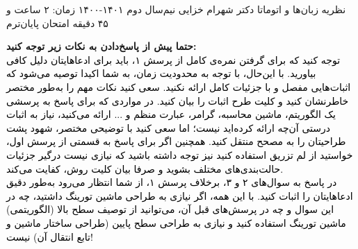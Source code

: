 \documentclass[a4paper,12pt]{article}
\begin{document}
\handout
{نظریه زبان‌ها و اتوماتا}
{دکتر شهرام خزایی}
{نیم‌سال دوم ۱۴۰۱-۱۴۰۰}
{}
{}
{زمان: ۲ ساعت و ۴۵ دقیقه}
 {امتحان پایان‌ترم}
 
\textbf{ حتما پیش از پاسخ‌دادن به نکات زیر توجه کنید:}\\
\textcolor{black}{ توجه کنید که برای گرفتن نمره‌ی کامل از پرسش‌ ۱، باید برای ادعاهایتان دلیل کافی بیاورید. با این‌حال، با توجه به محدودیت زمان، به شما اکیدا توصیه می‌شود که اثبات‌هایی مفصل و با جزئیات کامل ارائه نکنید. سعی کنید نکات مهم را به‌طور مختصر خاطرنشان کنید و کلیت طرح اثبات را بیان کنید. در مواردی که برای پاسخ به پرسشی یک الگوریتم، ماشین محاسبه، گرامر، عبارت منظم و ... ارائه می‌کنید، نیاز به اثبات درستی آن‌چه ارائه کرده‌اید نیست؛ اما سعی کنید با توضیحی مختصر، شهود پشت طراحیتان را به مصحح منتقل کنید. همچنین اگر برای پاسخ به قسمتی از پرسش اول، خواستید از لم تزریق استفاده کنید نیز توجه داشته باشید که نیازی نیست درگیر جزئیات حالت‌بندی‌های مختلف بشوید و صرفا بیان کلیت روش، کفایت می‌کند.\\
	در پاسخ به سوال‌های ۲ و ۳، برخلاف پرسش ۱، از شما انتظار می‌رود به‌طور دقیق ادعاهایتان را اثبات کنید. با این همه، اگر نیازی به طراحی ماشین تورینگ داشتید، چه در این سوال و چه در پرسش‌های قبل آن، می‌توانید از توصیف سطح بالا (الگوریتمی) ماشین تورینگ استفاده کنید و نیازی به طراحی سطح پایین (طراحی ساختار ماشین و تابع انتقال آن) نیست!}
\end{document}

